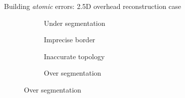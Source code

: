 \documentclass[10pt, export]{beamer}
\begin{document}
        \begin{frame}{Building \textit{atomic} errors: 2.5D overhead reconstruction case}
            \begin{figure}
                \begin{center}
                    \begin{subfigure}{.28\textwidth}
                        \caption{\label{fig::bul_under} Under segmentation}
                    \end{subfigure}
                    \begin{subfigure}{.28\textwidth}
                        \caption{\label{fig::bul_footprint} Imprecise border}
                    \end{subfigure}
                    \begin{subfigure}{.28\textwidth}
                        \caption{\label{fig::bul_height} Inaccurate topology}
                    \end{subfigure}
                    \begin{subfigure}{.33\textwidth}
                        \caption{\label{fig::bul_over} Over segmentation}
                    \end{subfigure}
                \end{center}
            \end{figure}
        \end{frame}
\end{document}
